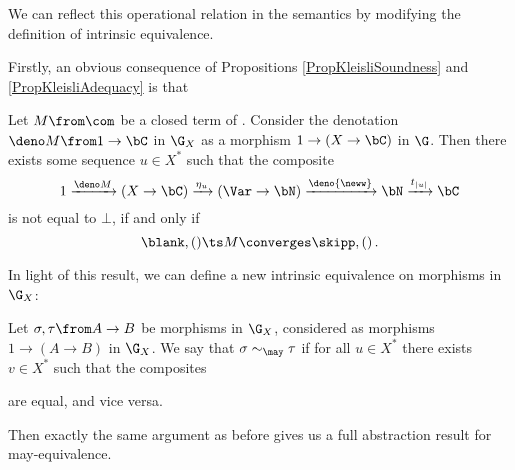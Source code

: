 We can reflect this operational relation in the semantics by modifying the definition of intrinsic equivalence.  

Firstly, an obvious consequence of Propositions \ref{PropKleisliSoundness} and \ref{PropKleisliAdequacy} is that

\begin{corollary}
  Let $M\from\com$ be a closed term of \IAX.  
  Consider the denotation $\deno M\from 1 \to \bC$ in $\G_X$ as a morphism $1 \to (X \to \bC)$ in $\G$.  
  Then there exists some sequence $u\in X^*$ such that the composite
  \[
    1 \xrightarrow{\deno M}
    (X \to \bC) \xrightarrow{\eta_u}
    (\Var \to \bN) \xrightarrow{\deno{\neww}}
    \bN \xrightarrow{t_{|u|}}
    \bC
    \]
  is not equal to $\bot$, if and only if
  \[
    \blank,()\ts M \converges \skipp,()\,.
    \]
  \label{CorMayAdequacy}
\end{corollary}

In light of this result, we can define a new intrinsic equivalence on morphisms in $\G_X$:

\begin{definition}
  Let $\sigma,\tau\from A \to B$ be morphisms in $\G_X$, considered as morphisms $1 \to (A \to B)$ in $\G_X$.  
  We say that $\sigma \sim_{\may} \tau$ if for all $u\in X^*$ there exists $v\in X^*$ such that the composites
  are equal, and vice versa.
  \label{DefMayIntrinsicEquivalence}
\end{definition}

Then exactly the same argument as before gives us a full abstraction result for may-equivalence.

